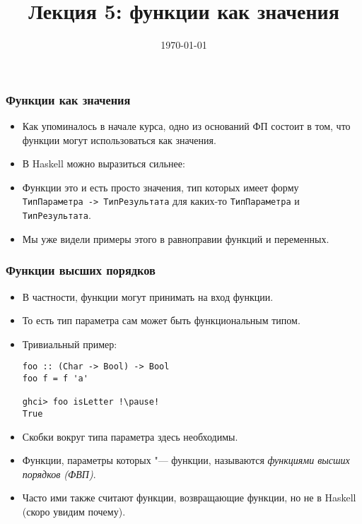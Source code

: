 \documentclass[10pt]{beamer}
\title{Лекция 5: функции как значения}
\date{\today}
\begin{document}
\begin{frame}[plain]
\maketitle
\end{frame}

\begin{frame}[fragile]
\frametitle{Функции как значения}
\begin{itemize}
    \item Как упоминалось в начале курса, одно из оснований ФП состоит в том, что функции могут использоваться как значения.
    \item В Haskell можно выразиться сильнее:\pause
    \item Функции это и есть просто значения, тип которых имеет форму \lstinline|ТипПараметра -> ТипРезультата| для каких-то \lstinline|ТипПараметра| и \lstinline|ТипРезультата|.\pause
    \item Мы уже видели примеры этого в равноправии функций и переменных.
\end{itemize}
\end{frame}

\begin{frame}[fragile]
\frametitle{Функции высших порядков}
\begin{itemize}
    \item В частности, функции могут принимать на вход функции.
    \item То есть тип параметра сам может быть функциональным типом. 
    \item Тривиальный пример:
\begin{lstlisting}
foo :: (Char -> Bool) -> Bool
foo f = f 'a'

ghci> foo isLetter !\pause!
True
\end{lstlisting} 
    \item Скобки вокруг типа параметра здесь необходимы.\pause
    \item Функции, параметры которых "--- функции, называются \emph{функциями высших порядков (ФВП)}.\pause
    \item Часто ими также считают функции, возвращающие функции, но не в Haskell (скоро увидим почему).
\end{itemize}
\end{frame}
\end{document}
